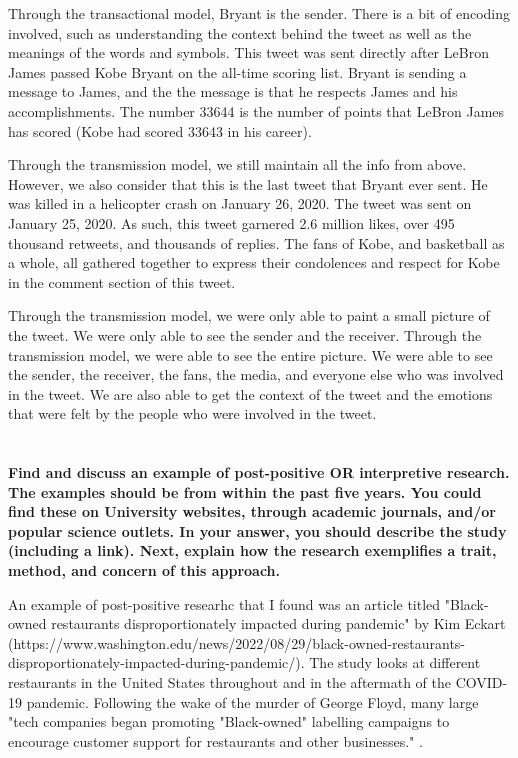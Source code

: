 \documentclass[a4paper]{article}
\begin{document}
        Through the transactional model, Bryant is the sender. There is a bit of encoding involved, such as understanding
        the context behind the tweet as well as the meanings of the words and symbols. This tweet was sent directly 
        after LeBron James passed Kobe Bryant on the all-time scoring list. Bryant is sending a message to James, and the
        the message is that he respects James and his accomplishments. The number 33644 is the number of points that 
        LeBron James has scored (Kobe had scored 33643 in his career). 

        Through the transmission model, we still maintain all the info from above. However, we also consider that this is 
        the last tweet that Bryant ever sent. He was killed in a helicopter crash on January 26, 2020. The tweet was sent
        on January 25, 2020. As such, this tweet garnered 2.6 million likes, over 495 thousand retweets, and 
        thousands of replies. The fans of Kobe, and basketball as a whole, all gathered together to express their 
        condolences and respect for Kobe in the comment section of this tweet. 

        Through the transmission model, we were only able to paint a small picture of the tweet. We were only able to see
        the sender and the receiver. Through the transmission model, we were able to see the entire picture. We were able
        to see the sender, the receiver, the fans, the media, and everyone else who was involved in the tweet. We are also 
        able to get the context of the tweet and the emotions that were felt by the people who were involved in the tweet.

    \section{}
        \textbf{Find and discuss an example of post-positive OR interpretive research. The examples should be from within the past five years. You could find these on University websites, through academic journals, and/or popular science outlets. In your answer, you should describe the study (including a link). Next, explain how the research exemplifies a trait, method, and concern of this approach.}
        
        An example of post-positive researhc that I found was an article titled "Black-owned restaurants disproportionately impacted during pandemic" by 
        Kim Eckart \citep{eckart2022} ({https://www.washington.edu/news/2022/08/29/black-owned-restaurants-disproportionately-impacted-during-pandemic/}). The study looks at different restaurants in the United States throughout and in 
        the aftermath of the COVID-19 pandemic. Following the wake of the murder of George Floyd, many large "tech companies 
        began promoting "Black-owned" labelling campaigns to encourage customer support for restaurants and other businesses." \cite{eckart2022}.
\end{document}

